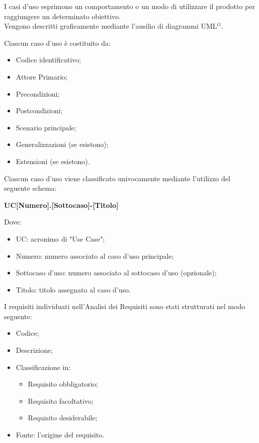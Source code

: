 

    I casi d’uso esprimono un comportamento o un modo di utilizzare il prodotto per raggiungere un determinato obiettivo. \\
    Vengono descritti graficamente mediante l’ausilio di diagrammi UML$^{G}$. 

    Ciascun caso d’uso è costituito da:
    \begin{itemize}
        \item Codice identificativo;
        \item Attore Primario;
        \item Precondizioni;
        \item Postcondizioni;
        \item Scenario principale;
        \item Generalizzazioni (se esistono);
        \item Estensioni (se esistono).
        
    \end{itemize}


    Ciascun caso d’uso viene classificato univocamente mediante l’utilizzo del seguente schema:

        \begin{center}
            \large{\textbf{UC[Numero].[Sottocaso]-[Titolo]}}
        \end{center}
    Dove:
    \begin{itemize}
        \item UC: acronimo di "Use Case";
        \item Numero: numero associato al caso d'uso principale;
        \item Sottocaso d'uso: numero associato al sottocaso d'uso (opzionale);
        \item Titolo: titolo assegnato al caso d'uso.
    \end{itemize}
    

    I requisiti individuati nell’Analisi dei Requisiti sono stati strutturati nel modo seguente:

    \begin{itemize}
        \item Codice;
        \item Descrizione;
        \item Classificazione in:  \begin{itemize}
                                        \item Requisito obbligatorio;
                                        \item Requisito facoltativo;
                                        \item Requisito desiderabile;
        \end{itemize}
        \item Fonte: l'origine del requisito.
    \end{itemize}

